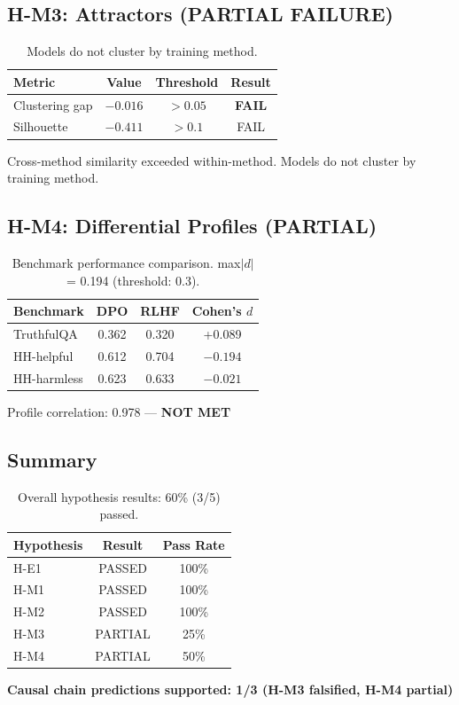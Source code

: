 \subsection{H-M3: Attractors (PARTIAL FAILURE)}

\begin{table}[h]
\centering
\begin{tabular}{lccc}
\toprule
Metric & Value & Threshold & Result \\
\midrule
Clustering gap & $\mathbf{-0.016}$ & $>0.05$ & \textbf{FAIL} \\
Silhouette & $-0.411$ & $>0.1$ & FAIL \\
\bottomrule
\end{tabular}
\caption{Models do not cluster by training method.}
\label{tab:attractors}
\end{table}

Cross-method similarity exceeded within-method. Models do not cluster by training method.

\subsection{H-M4: Differential Profiles (PARTIAL)}

\begin{table}[h]
\centering
\begin{tabular}{lccc}
\toprule
Benchmark & DPO & RLHF & Cohen's $d$ \\
\midrule
TruthfulQA & 0.362 & 0.320 & +0.089 \\
HH-helpful & 0.612 & 0.704 & $-0.194$ \\
HH-harmless & 0.623 & 0.633 & $-0.021$ \\
\bottomrule
\end{tabular}
\caption{Benchmark performance comparison. max$|d|$ = 0.194 (threshold: 0.3).}
\label{tab:profiles}
\end{table}

Profile correlation: 0.978 --- \textbf{NOT MET}

\subsection{Summary}

\begin{table}[h]
\centering
\begin{tabular}{lcc}
\toprule
Hypothesis & Result & Pass Rate \\
\midrule
H-E1 & PASSED & 100\% \\
H-M1 & PASSED & 100\% \\
H-M2 & PASSED & 100\% \\
H-M3 & PARTIAL & 25\% \\
H-M4 & PARTIAL & 50\% \\
\bottomrule
\end{tabular}
\caption{Overall hypothesis results: 60\% (3/5) passed.}
\label{tab:summary}
\end{table}

\textbf{Causal chain predictions supported: 1/3 (H-M3 falsified, H-M4 partial)}
